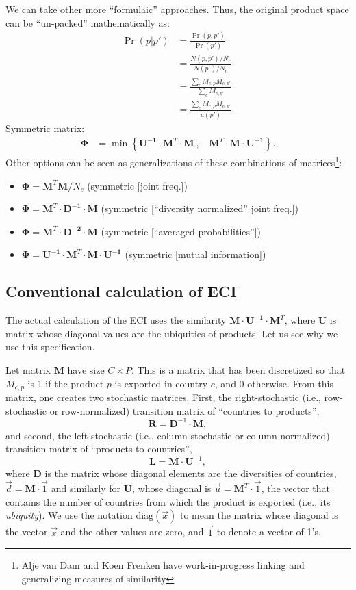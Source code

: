 \documentclass[12pt]{article}
\newcommand{\mtx}[1]{\mathbf{ #1}}
\newcommand{\diag}[1]{\mathrm{diag}\left( #1\right)}
\begin{document}
We can take other more ``formulaic'' approaches. Thus, the original product space can be ``un-packed'' mathematically as:
\begin{align}
	\Pr(p|p') &= \frac{\Pr(p,p')}{\Pr(p')} \nonumber \\
	&= \frac{N(p,p')/N_c}{N(p')/N_c} \nonumber \\
	&= \frac{\sum_c M_{c,p}M_{c,p'}}{\sum_c M_{c,p'}}  \nonumber \\
	&= \frac{\sum_c M_{c,p}M_{c,p'}}{u(p')}. 
\end{align}
Symmetric matrix:
\begin{align*}
	\mtx{\Phi} &= \min\left\{\mtx{U^{-1}}\cdot\mtx{M}^T\cdot\mtx{M}~,~~~~ \mtx{M}^T\cdot\mtx{M}\cdot\mtx{U^{-1}}\right\}.
\end{align*}
Other options can be seen as generalizations of these combinations of matrices\footnote{Alje van Dam and Koen Frenken have work-in-progress linking and generalizing measures of similarity}:
\begin{itemize}
	\item $\mtx{\Phi} = \mtx{M}^T\mtx{M}/N_c$ (symmetric [joint freq.])
	\item $\mtx{\Phi} = \mtx{M}^T\cdot\mtx{D^{-1}}\cdot\mtx{M}$ (symmetric [``diversity normalized'' joint freq.])
	\item $\mtx{\Phi} = \mtx{M}^T\cdot\mtx{D^{-2}}\cdot\mtx{M}$ (symmetric [``averaged probabilities''])
	\item $\mtx{\Phi} = \mtx{U^{-1}}\cdot\mtx{M}^T\cdot\mtx{M}\cdot\mtx{U^{-1}}$ (symmetric [mutual information])
\end{itemize}

\subsection{Conventional calculation of ECI}
\label{sec:ECIdefinition}
The actual calculation of the ECI uses the similarity $\mtx{M}\cdot\mtx{U^{-1}}\cdot\mtx{M}^T$, where $\mtx{U}$ is matrix whose diagonal values are the ubiquities of products. Let us see why we use this specification. 

Let  matrix $\mtx{M}$ have size $C\times P$. This is a matrix that has been discretized so that $M_{c,p}$ is 1 if the product $p$ is exported in country $c$, and 0 otherwise. From this matrix, one creates two stochastic matrices. First, the right-stochastic (i.e., row-stochastic or row-normalized) transition matrix of ``countries to products'', $$\mtx{R}=\mtx{D}^{-1}\cdot\mtx{M},$$ and second, the left-stochastic (i.e., column-stochastic or column-normalized) transition matrix of ``products to countries'', $$\mtx{L}=\mtx{M}\cdot\mtx{U}^{-1},$$ where $\mtx{D}$ is the matrix whose diagonal elements are the diversities of countries, $\vec{d}=\mtx{M}\cdot\vec{1}$ and similarly for $\mtx{U}$, whose diagonal is $\vec{u}=\mtx{M}^T\cdot\vec{1}$, the vector that contains the number of countries from which the product is exported (i.e., its \emph{ubiquity}). We use the notation $\diag{\vec{x}}$ to mean the matrix whose diagonal is the vector $\vec{x}$ and the other values are zero, and $\vec{1}$ to denote a vector of 1's.
\end{document}
